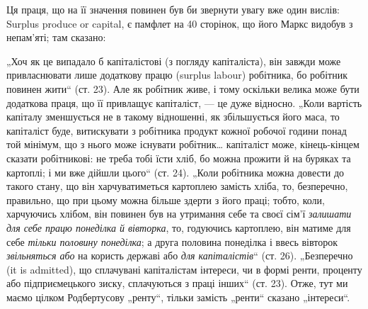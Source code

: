 \parcont{}  %
Ця праця, що на її значення повинен був би звернути увагу вже один
вислів: Surplus produce or capital, є памфлет на 40 сторінок, що його
Маркс видобув з непам’яті; там сказано:

„Хоч як це випадало б капіталістові (з погляду капіталіста), він
завжди може привласнювати лише додаткову працю (surplus labour) робітника,
бо робітник повинен жити“ (ст. 23). Але як робітник живе,
і тому оскільки велика може бути додаткова праця, що її привлащує
капіталіст, — це дуже відносно. „Коли вартість капіталу зменшується
не в такому відношенні, як збільшується його маса, то капіталіст буде,
витискувати з робітника продукт кожної робочої години понад той мінімум,
що з нього може існувати робітник\dots{} капіталіст може, кінець-кінцем
сказати робітникові: не треба тобі їсти хліб, бо можна прожити й на
буряках та картоплі; і ми вже дійшли цього“ (ст. 24). „Коли робітника
можна довести до такого стану, що він харчуватиметься картоплею замість
хліба, то, безперечно, правильно, що при цьому можна більше здерти з
його праці; тобто, коли, харчуючись хлібом, він повинен був на утримання
себе та своєї сім’ї \emph{залишати для себе працю понеділка й вівторка},
то, годуючись картоплею, він матиме для себе  \emph{тільки половину понеділка};
а друга половина понеділка і ввесь вівторок  \emph{звільняться або} на користь
державі або  \emph{для капіталістів}“ (ст. 26). „Безперечно (it is admitted),
що сплачувані капіталістам інтереси, чи в формі ренти, проценту або
підприємецького зиску, сплачуються з праці інших“ (ст. 23). Отже, тут
ми маємо цілком Родбертусову „ренту“, тільки замість „ренти“ сказано
„інтереси“.

